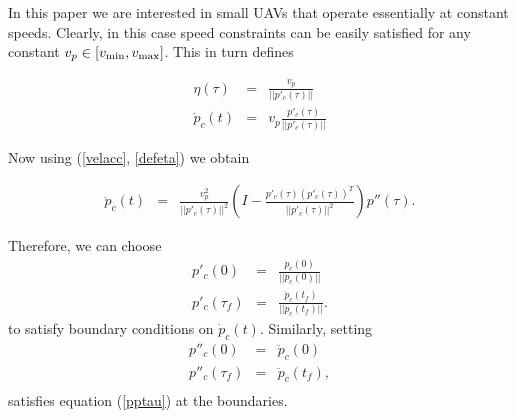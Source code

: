 \documentclass[]{aiaa-tc}%
\begin{document}
%
%


In this paper we are interested in small UAVs that operate essentially at constant speeds.
Clearly, in this case speed constraints can be easily satisfied for any constant $ v_p \in [v_{{\rm min}},
v_{{\rm max}} ]$. This in turn defines

\begin{eqnarray}
\eta(\tau) &=&  \frac{v_p}{||p'_c(\tau)||} \label{defeta}\\
\dot p_c(t) &=& v_p \frac{p'_c(\tau)}{|| p'_c(\tau)||} \label{ptau}
\end{eqnarray}

\noindent Now using (\ref{velacc}, \ref{defeta}) we obtain

\begin{eqnarray}
\ddot{p}_c(t)&=&\frac{v_p^2}{||p'_c(\tau)||^2} (I - \frac{p'_c(\tau)
(p'_c(\tau))^T}{||p'_c(\tau)||^2}) p''(\tau). \label{pptau}
\end{eqnarray}

\noindent Therefore, we can choose
\begin{eqnarray}
p'_c(0) &=& \frac{\dot p_c(0)}{||\dot p_c(0)||} \label{ptau0} \\
p'_c(\tau_f) &=& \frac{\dot p_c(t_f)}{||\dot p_c(t_f)||}.
\label{ptauf}
\end{eqnarray}
\noindent to satisfy boundary conditions on $\dot p_c(t)$. Similarly, setting
\begin{eqnarray*}
p''_c(0) &=& \ddot p_c(0) \label{pptau0} \\
p''_c(\tau_f) &=& \ddot p_c(t_f)  \label{pptauf}, \\
\end{eqnarray*}
satisfies equation (\ref{pptau}) at the boundaries.
\end{document}
